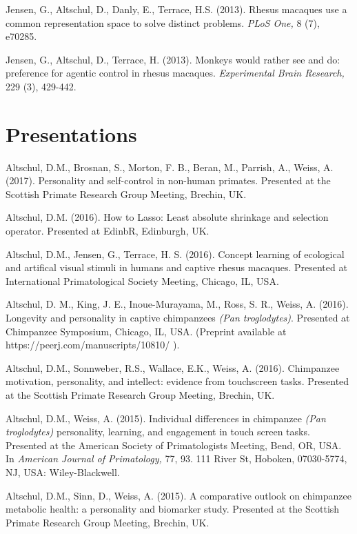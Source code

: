 \documentclass[margin,line]{res}
\begin{document}
\begin{resume}
Jensen, G., Altschul, D., Danly, E., Terrace, H.S. (2013). Rhesus macaques use a common representation space to solve distinct problems. {\it PLoS One,} 8 (7), e70285.

Jensen, G., Altschul, D., Terrace, H. (2013). Monkeys would rather see and do: preference for agentic control in rhesus macaques. {\it Experimental Brain Research,} 229 (3), 429-442.

\vspace{0.7cm}

\section{\sc Presentations} 

Altschul, D.M., Brosnan, S., Morton, F. B., Beran, M., Parrish, A., Weiss, A. (2017). Personality and self-control in non-human primates. Presented at the Scottish Primate Research Group Meeting, Brechin, UK.

Altschul, D.M. (2016). How to Lasso: Least absolute shrinkage and selection operator. Presented at EdinbR, Edinburgh, UK.

Altschul, D.M., Jensen, G.,  Terrace, H. S. (2016). Concept learning of ecological and artifical visual stimuli in humans and captive rhesus macaques. Presented at International Primatological Society Meeting, Chicago, IL, USA.

Altschul, D. M., King, J. E., Inoue-Murayama, M., Ross, S. R., Weiss, A. (2016). Longevity and personality in captive chimpanzees {\it (Pan troglodytes)}. Presented at Chimpanzee Symposium, Chicago, IL, USA. (Preprint available at https://peerj.com/manuscripts/10810/ ).

Altschul, D.M., Sonnweber, R.S., Wallace, E.K., Weiss, A. (2016). Chimpanzee motivation, personality, and intellect: evidence from touchscreen tasks. Presented at the Scottish Primate Research Group Meeting, Brechin, UK.

Altschul, D.M., Weiss, A. (2015). Individual differences in chimpanzee {\it (Pan troglodytes)} personality, learning, and engagement in touch screen tasks. Presented at the American Society of Primatologists Meeting, Bend, OR, USA. In {\it American Journal of Primatology,} 77, 93. 111 River St, Hoboken, 07030-5774, NJ, USA: Wiley-Blackwell.

Altschul, D.M., Sinn, D., Weiss, A. (2015). A comparative outlook on chimpanzee metabolic health: a personality and biomarker study. Presented at the Scottish Primate Research Group Meeting, Brechin, UK.


\end{resume}
\end{document}

